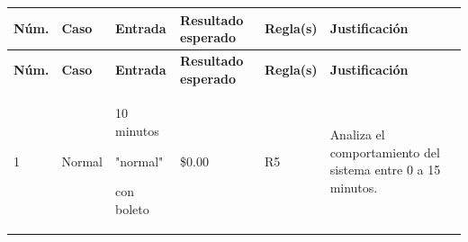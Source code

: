 \documentclass[11pt,letterpaper]{article}
\begin{document}
\begingroup

\small

\setlength{\tabcolsep}{8pt}

\renewcommand{\arraystretch}{1.10}
\setcellgapes{4pt}
\makegapedcells

\setlength\LTleft{\fill}
\setlength\LTright{\fill}

\begin{longtable}{
    |C{1.00cm}
    |L{1.95cm}
    |L{2.30cm}
    |L{2.00cm}
    |L{1.55cm}
    |L{4.35cm}|
}


\hline

\textbf{Núm.} &
\textbf{Caso} &
\textbf{Entrada} &
\textbf{Resultado esperado} &
\textbf{Regla(s)} &
\textbf{Justificación}
\\

\hline

\endfirsthead



\hline

\textbf{Núm.} &
\textbf{Caso} &
\textbf{Entrada} &
\textbf{Resultado esperado} &
\textbf{Regla(s)} &
\textbf{Justificación}
\\

\hline

\endhead


\endfoot

\endlastfoot




1 &
Normal &
10 minutos

"normal"

con boleto &
\$0.00 &
R5 &
Analiza el comportamiento del sistema entre 0 a 15 minutos.
\\
\hline


\end{longtable}
\end{document}

